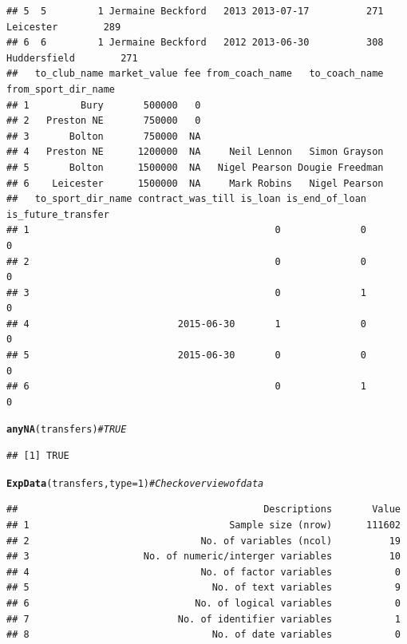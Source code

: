 \documentclass{article}\usepackage[]{graphicx}\usepackage[]{color}
\makeatletter
\newcommand{\hlnum}[1]{\textcolor[rgb]{0.686,0.059,0.569}{#1}}%
\newcommand{\hlcom}[1]{\textcolor[rgb]{0.678,0.584,0.686}{\textit{#1}}}%
\newcommand{\hlstd}[1]{\textcolor[rgb]{0.345,0.345,0.345}{#1}}%
\newcommand{\hlkwc}[1]{\textcolor[rgb]{0.333,0.667,0.333}{#1}}%
\newcommand{\hlkwd}[1]{\textcolor[rgb]{0.737,0.353,0.396}{\textbf{#1}}}%
\newenvironment{kframe}{%
 \def\at@end@of@kframe{}%
 \ifinner\ifhmode%
  \def\at@end@of@kframe{\end{minipage}}%
  \begin{minipage}{\columnwidth}%
 \fi\fi%
 \def\FrameCommand##1{\hskip\@totalleftmargin \hskip-\fboxsep
 \colorbox{shadecolor}{##1}\hskip-\fboxsep
     \hskip-\linewidth \hskip-\@totalleftmargin \hskip\columnwidth}%
 \MakeFramed {\advance\hsize-\width
   \@totalleftmargin\z@ \linewidth\hsize
   \@setminipage}}%
 {\par\unskip\endMakeFramed%
 \at@end@of@kframe}
\newenvironment{knitrout}{}{} %
\makeatother
\begin{document}
\begin{knitrout}
\begin{kframe}
\begin{verbatim}
## 5  5         1 Jermaine Beckford   2013 2013-07-17          271      Leicester        289
## 6  6         1 Jermaine Beckford   2012 2013-06-30          308   Huddersfield        271
##   to_club_name market_value fee from_coach_name   to_coach_name from_sport_dir_name
## 1         Bury       500000   0                                                    
## 2   Preston NE       750000   0                                                    
## 3       Bolton       750000  NA                                                    
## 4   Preston NE      1200000  NA     Neil Lennon   Simon Grayson                    
## 5       Bolton      1500000  NA   Nigel Pearson Dougie Freedman                    
## 6    Leicester      1500000  NA     Mark Robins   Nigel Pearson                    
##   to_sport_dir_name contract_was_till is_loan is_end_of_loan is_future_transfer
## 1                                           0              0                  0
## 2                                           0              0                  0
## 3                                           0              1                  0
## 4                          2015-06-30       1              0                  0
## 5                          2015-06-30       0              0                  0
## 6                                           0              1                  0
\end{verbatim}
\begin{alltt}
\hlkwd{anyNA}\hlstd{(transfers)} \hlcom{# TRUE}
\end{alltt}
\begin{verbatim}
## [1] TRUE
\end{verbatim}
\begin{alltt}
\hlkwd{ExpData}\hlstd{(transfers,} \hlkwc{type}\hlstd{=}\hlnum{1}\hlstd{)} \hlcom{# Check overview of data}
\end{alltt}
\begin{verbatim}
##                                           Descriptions       Value
## 1                                   Sample size (nrow)      111602
## 2                              No. of variables (ncol)          19
## 3                    No. of numeric/interger variables          10
## 4                              No. of factor variables           0
## 5                                No. of text variables           9
## 6                             No. of logical variables           0
## 7                          No. of identifier variables           1
## 8                                No. of date variables           0

\end{verbatim}
\end{kframe}
\end{knitrout}
\end{document}
